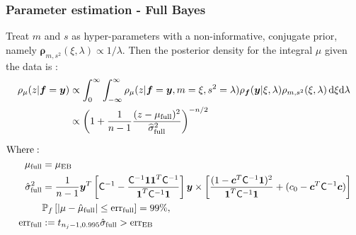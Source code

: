\documentclass[handout, 10pt,compress,xcolor={usenames,dvipsnames}]{beamer} %
\newcommand{\bm}[1]{\boldsymbol{#1}}
\newcommand{\MLE}{\textup{EB}}
\newcommand{\full}{\textup{full}}
\newcommand{\D}[1]{\text{d}{#1}}
\newcommand{\vrho}{\bm{\rho}}
\newcommand{\err}{{\text{err}}}
\newcommand{\pause}{}
\begin{document}
\begin{frame}
\frametitle{Parameter estimation - Full Bayes}
\vspace*{-6ex}
Treat $m$ and $s$ as hyper-parameters with a non-informative, conjugate prior, namely $\vrho_{m,s^2}(\xi, \lambda) \propto 1/\lambda$.
Then the posterior density for the integral $\mu$ given the data is :
\vspace*{-2.0ex}
\begin{align*}
\rho_{\mu}(z | \vf = \vy)
& \propto \int_{0}^\infty \int_{-\infty}^\infty \rho_{\mu}(z | \vf = \vy, m = \xi, s^2 = \lambda)  
\rho_{\vf}(\vy | \xi, \lambda ) \rho_{m, s^2}(\xi, \lambda) \, \D \xi \D \lambda 
\\ & \propto \left(1 +  \frac{1}{n-1} \frac{(z - \mu_{\full})^2}{\widehat{\sigma}_{\full}^2} \right)^{-n/2}
\end{align*}
\pause
\vspace{-4ex}
\begin{align*}
\text{Where}: \;
\\
\mu_{\full} &= \mu_\MLE
\\
\hsigma^2_{\full} 
& = \frac{1}{n-1}
\vy^T\left[ \mC^{-1} 
- \frac{ \mC^{-1} \vone\vone^T \mC^{-1}}{\vone^T \mC^{-1} \vone}  \right]\vy
\times  \left[\frac{(1 - \vc^T \mC^{-1} \vone)^2}{\vone^T \mC^{-1} \vone} + (c_0  -\vc ^T \mC^{-1} \vc) \right]
\\ &\mathbb{P}_f \left[ |\mu-\hmu_{\full}|  \leq \err_{\full} \right]  = 99\%,
\\ \err_{\full} &:= t_{n_j-1,0.995} \hat{\sigma}_{\full} > \err_{\MLE}
\end{align*}
\end{frame}




\end{document}
